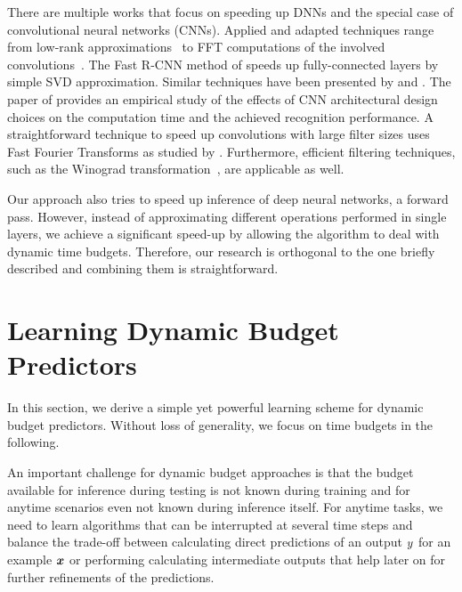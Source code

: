 \documentclass{bmvc2k}
\begin{document}
    There are multiple works that focus on speeding up DNNs and the special case of
    convolutional neural networks (CNNs). Applied and adapted techniques
    range from low-rank approximations~\cite{jaderberg2014speeding,girshick2014rich,denton2014exploiting} to
    FFT computations of the involved convolutions~\cite{mathieu2013fast}.
    The Fast R-CNN method of \cite{girshick2014rich} speeds up fully-connected layers by simple SVD approximation.
    Similar techniques have been presented by \cite{denton2014exploiting} and \cite{jaderberg2014speeding}.
    The paper of \cite{He14:CNN} provides an empirical study of the effects of CNN architectural design choices
    on the computation time and the achieved recognition performance.
    A straightforward technique to speed up convolutions with large filter sizes uses Fast Fourier Transforms as
    studied by \cite{mathieu2013fast}. Furthermore, efficient filtering techniques, such as the Winograd transformation~\cite{lavin2015fast},
    are applicable as well.

    Our approach also tries to speed up inference of deep neural networks, \ie a forward pass. However,
    instead of approximating different operations performed in single layers, we achieve a significant speed-up by
    allowing the algorithm to deal with dynamic time budgets. Therefore, our research is orthogonal to the one briefly described
    and combining them is straightforward.

\section{Learning Dynamic Budget Predictors}
\label{sec:anytimepred}

In this section, we derive a simple yet powerful learning scheme for dynamic budget predictors. Without
loss of generality, we focus on time budgets in the following.

    An important challenge for dynamic budget approaches is that the budget available for
    inference during testing is not known during training and for anytime scenarios even not known
    during inference itself.
    For anytime tasks, we need to learn algorithms that can be interrupted at several time steps
    and balance the trade-off between calculating direct predictions of an output $y$
    for an example $\bm{x}$ or performing calculating intermediate outputs that help later
    on for further refinements of the predictions.
\end{document}
